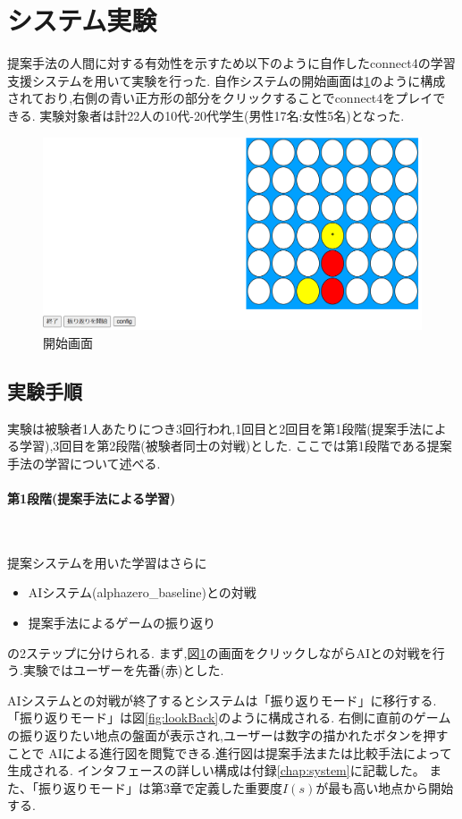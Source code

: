 \section{システム実験}
提案手法の人間に対する有効性を示すため以下のように自作したconnect4の学習支援システムを用いて実験を行った.
自作システムの開始画面は\ref{fig:basic}のように構成されており,右側の青い正方形の部分をクリックすることでconnect4をプレイできる.
実験対象者は計22人の10代-20代学生(男性17名:女性5名)となった.
\begin{figure}[t]
	\centering
	\includegraphics[width=\linewidth]{./figure/basicSystem.png}
	\caption{開始画面}
	\label{fig:basic}
\end{figure}
\subsection{実験手順}
実験は被験者1人あたりにつき3回行われ,1回目と2回目を第1段階(提案手法による学習),3回目を第2段階(被験者同士の対戦)とした.
ここでは第1段階である提案手法の学習について述べる.
\newpage
\paragraph{第1段階(提案手法による学習)}~
\par 提案システムを用いた学習はさらに
\begin{itemize}
	\item AIシステム(alphazero\_baseline)との対戦
	\item 提案手法によるゲームの振り返り
\end{itemize}
の2ステップに分けられる.
まず,図\ref{fig:basic}の画面をクリックしながらAIとの対戦を行う.実験ではユーザーを先番(赤)とした.


AIシステムとの対戦が終了するとシステムは「振り返りモード」に移行する.
「振り返りモード」は図\ref{fig:lookBack}のように構成される.
右側に直前のゲームの振り返りたい地点の盤面が表示され,ユーザーは数字の描かれたボタンを押すことで
AIによる進行図を閲覧できる.進行図は提案手法または比較手法によって生成される.
インタフェースの詳しい構成は付録\ref{chap:system}に記載した。
また、「振り返りモード」は第3章で定義した重要度$I(s)$が最も高い地点から開始する.

